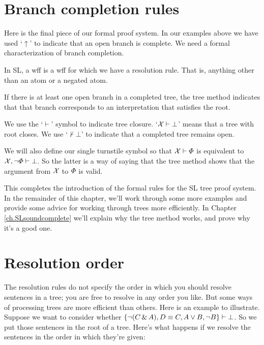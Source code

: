 \section{Branch completion rules}
\label{sec.SL.tree.completion}
Here is the final piece of our formal proof system. In our examples above we have used `$\uparrow$' to indicate that an open branch is complete. We need a formal characterization of branch completion.

In SL, a  wff is a wff for which we have a resolution rule. That is, anything other than an atom or a negated atom.


If there is at least one open branch in a completed tree, the tree method indicates that that branch corresponds to an interpretation that satisfies the root.

We use the `$\vdash{}$' symbol to indicate tree closure. `$\mathcal{X}{}\vdash{} \bot$' means that a tree with root \metaSetX{} closes. We use `$\nvdash{}\bot$' to indicate that a completed tree remains open.

We will also define our single turnstile symbol so that $\mathcal{X}{}\vdash{} \varPhi{}$ is equivalent to $\mathcal{X}{}, \neg\varPhi{}\vdash{}\bot$. So the latter is a way of saying that the tree method shows that the argument from $\mathcal{X}{}$ to $\varPhi{}$ is valid.

This completes the introduction of the formal rules for the SL tree proof system. In the remainder of this chapter, we'll work through some more examples and provide some advice for working through trees more efficiently. In Chapter \ref{ch.SLsoundcomplete} we'll explain why the tree method works, and prove why it's a good one.

\section{Resolution order}

The resolution rules do not specify the order in which you should resolve sentences in a tree; you are free to resolve in any order you like. But some ways of processing trees are more efficient than others. Here is an example to illustrate. Suppose we want to consider whether $\{\neg (C \,\&\, A), D \equiv C, A \vee B, \neg B\}\vdash{}\bot$. So we put those sentences in the root of a tree. Here's what happens if we resolve the sentences in the order in which they're given:

